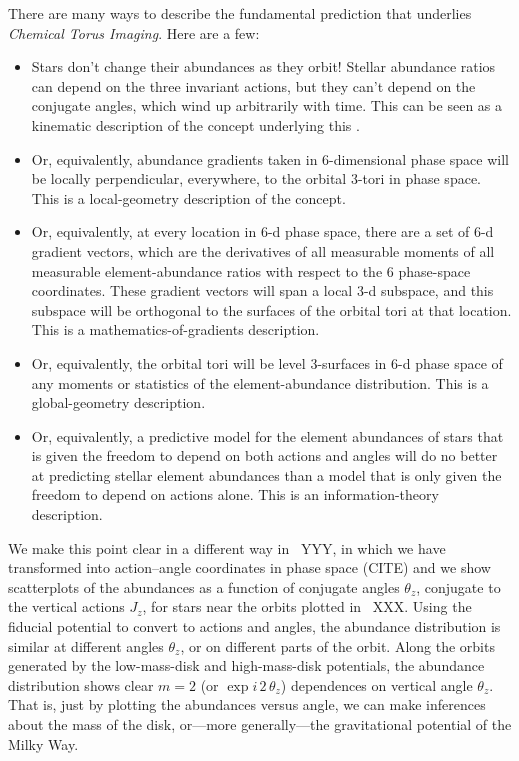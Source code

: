 \documentclass[modern]{aastex63}
\newcommand{\methodname}{\textsl{Chemical Torus Imaging}}
\begin{document}
There are many ways to describe the fundamental prediction that underlies \methodname.
Here are a few:
\begin{itemize}
\item
  Stars don't change their abundances as they orbit!  Stellar
  abundance ratios can depend on the three invariant actions, but they
  can't depend on the conjugate angles, which wind up arbitrarily with time.
  This can be seen as a kinematic description of the concept underlying this \documentname.
\item
  Or, equivalently, abundance gradients taken in 6-dimensional phase space will be
  locally perpendicular, everywhere, to the orbital 3-tori in phase space.
  This is a local-geometry description of the concept.
\item
  Or, equivalently, at every location in 6-d phase space, there are a set of 6-d
  gradient vectors, which are the derivatives of all measurable
  moments of all measurable element-abundance ratios with respect to
  the 6 phase-space coordinates. These gradient vectors will span a
  local 3-d subspace, and this subspace will be orthogonal to the surfaces
  of the orbital tori at that location.
  This is a mathematics-of-gradients description.
\item
  Or, equivalently, the orbital tori will be level 3-surfaces in 6-d phase space of any
  moments or statistics of the element-abundance distribution.
  This is a global-geometry description.
\item
  Or, equivalently, a predictive model for the element abundances of stars
  that is given the freedom to depend on both actions and angles will do no
  better at predicting stellar element abundances than a model that is only
  given the freedom to depend on actions alone.
  This is an information-theory description.
\end{itemize}


We make this point clear in a different way in \figurename~YYY, in which
we have transformed into action--angle coordinates in phase space (CITE)
and we show scatterplots of the abundances as a function of conjugate
angles $\theta_z$, conjugate to the vertical actions $J_z$, for stars near
the orbits plotted in \figurename~XXX.
Using the fiducial potential to convert to actions and angles,
the abundance distribution is similar at different
angles $\theta_z$, or on different parts of the orbit.
Along the orbits generated by the low-mass-disk and high-mass-disk potentials,
the abundance distribution shows clear $m=2$ (or $\exp i\,2\,\theta_z$) dependences
on vertical angle $\theta_z$.
That is, just by plotting the abundances versus angle, we can make
inferences about the mass of the disk, or---more generally---the
gravitational potential of the Milky Way.
\end{document}
